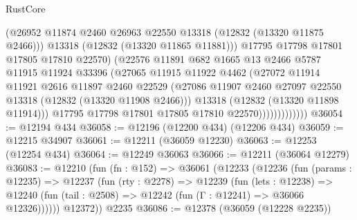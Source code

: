 \begin{lexlean}{RustCore}
\begin{coremodule}
                              (@26952
                                @11874
                                @2460
                                @26963
                                @22550
                                @13318
                                (@12832 (@13320 @11875 @2466)))
                              @13318
                              (@12832 (@13320 @11865 @11881)))
                            @17795
                            @17798
                            @17801
                            @17805
                            @17810
                            @22570)
                          (@22576
                            @11891
                            @682
                            @1665
                            @13
                            @2466
                            @5787
                            @11915
                            @11924
                            @33396
                            (@27065
                              @11915
                              @11922
                              @4462
                              (@27072
                                @11914
                                @11921
                                @2616
                                @11897
                                @2460
                                @22529
                                (@27086
                                  @11907
                                  @2460
                                  @27097
                                  @22550
                                  @13318
                                  (@12832 (@13320 @11908 @2466)))
                                @13318
                                (@12832 (@13320 @11898 @11914)))
                              @17795
                              @17798
                              @17801
                              @17805
                              @17810
                              @22570)))))))))))))
@36054 := @12194 @434
@36058 := @12196 (@12200 @434) (@12206 @434)
@36059 := @12215 @34907
@36061 := @12211 (@36059 @12230)
@36063 := @12253 (@12254 @434)
@36064 := @12249 @36063
@36066 := @12211 (@36064 @12279)
@36083 := @12210
    (fun (fn : @152) =>
    @36061
      (@12233
        (@12236
          (fun (params : @12235) =>
          @12237
            (fun (rty : @2278) =>
            @12239
              (fun (lets : @12238) =>
              @12240 (fun (tail : @2508) => @12242 (fun (Γ : @12241) => @36066 @12326))))))
        @12372))
    @2235
@36086 := @12378 (@36059 (@12228 @2235))

\end{coremodule}
\end{lexlean}
